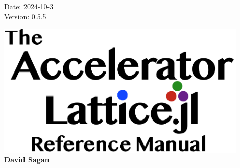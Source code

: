 
\thispagestyle{empty}

\hfill
\large\parbox[b]{1.8in}{
  Date: 2024-10-3 \\
  Version: 0.5.5
}


\vfill

{
\begin{center}
\includegraphics[width=12cm]{AcceleratorLattice-manual-logo.pdf} \\
\vskip 0.3in
\huge\bf David Sagan
\end{center}
}

\vfill
\break
